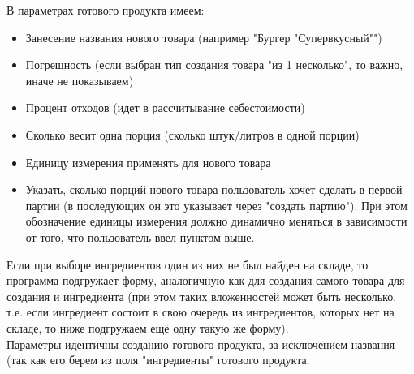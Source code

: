 \documentclass[DIV=calc, paper=a4, fontsize=11pt]{scrartcl} %
\begin{document}
В параметрах готового продукта имеем:

\begin{itemize}
	\item Занесение названия нового товара (например "Бургер "Супервкусный"")
	\item Погрешность (если выбран тип создания товара "из 1 несколько", то важно, иначе не показываем)
	\item Процент отходов (идет в рассчитывание себестоимости)
	\item Сколько весит одна порция (сколько штук/литров в одной порции)
	\item Единицу измерения применять для нового товара
	\item Указать, сколько порций нового товара пользователь хочет сделать в первой партии (в последующих он это указывает через "создать партию"). При этом обозначение единицы измерения должно динамично меняться в зависимости от того, что пользователь ввел пунктом выше.
\end{itemize}

Если при выборе ингредиентов один из них не был найден на складе, то программа подгружает форму, аналогичную как для создания самого товара для создания и ингредиента (при этом таких вложенностей может быть несколько, т.е. если ингредиент состоит в свою очередь из ингредиентов, которых нет на складе, то ниже подгружаем ещё одну такую же форму).
\\[0.5cm]
Параметры идентичны созданию готового продукта, за исключением названия (так как его берем из поля "ингредиенты" готового продукта.
\end{document}
